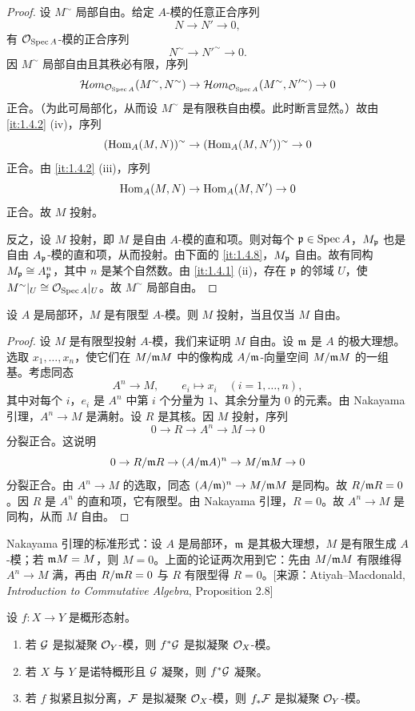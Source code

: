 \begin{proof}
设 $M^\sim$ 局部自由。给定 $A$-模的任意正合序列
\[
N\to N'\to0,
\]
有 $\mathcal{O}_{\operatorname{Spec} A}$-模的正合序列
\[
N^\sim\to N'^\sim\to0.
\]
因 $M^\sim$ 局部自由且其秩必有限，序列
\[
\mathcal{H}om_{\mathcal{O}_{\operatorname{Spec} A}}(M^\sim,N^\sim)\to\mathcal{H}om_{\mathcal{O}_{\operatorname{Spec} A}}(M^\sim,N'^\sim)\to0
\]
正合。（为此可局部化，从而设 $M^\sim$ 是有限秩自由模。此时断言显然。）故由 \ref{it:1.4.2} (iv)，序列
\[
(\operatorname{Hom}_A(M,N))^\sim\to(\operatorname{Hom}_A(M,N'))^\sim\to0
\]
正合。由 \ref{it:1.4.2} (iii)，序列
\[
\operatorname{Hom}_A(M,N)\to\operatorname{Hom}_A(M,N')\to0
\]
正合。故 $M$ 投射。

反之，设 $M$ 投射，即 $M$ 是自由 $A$-模的直和项。则对每个 $\mathfrak{p}\in\operatorname{Spec} A$，$M_{\mathfrak{p}}$ 也是自由 $A_{\mathfrak{p}}$-模的直和项，从而投射。由下面的 \ref{it:1.4.8}，$M_{\mathfrak{p}}$ 自由。故有同构 $M_{\mathfrak{p}}\cong A_{\mathfrak{p}}^n$，其中 $n$ 是某个自然数。由 \ref{it:1.4.1} (ii)，存在 $\mathfrak{p}$ 的邻域 $U$，使 $M^\sim|_U\cong\mathcal{O}_{\operatorname{Spec} A}|_U$。故 $M^\sim$ 局部自由。
\end{proof}

\begin{lemma}\label{it:1.4.8}
设 $A$ 是局部环，$M$ 是有限型 $A$-模。则 $M$ 投射，当且仅当 $M$ 自由。
\end{lemma}

\begin{proof}
设 $M$ 是有限型投射 $A$-模，我们来证明 $M$ 自由。设 $\mathfrak{m}$ 是 $A$ 的极大理想。选取 $x_1,\dots,x_n$，使它们在 $M/\mathfrak{m} M$ 中的像构成 $A/\mathfrak{m}$-向量空间 $M/\mathfrak{m} M$ 的一组基。考虑同态
\[
A^n\to M,\qquad e_i\mapsto x_i\quad(i=1,\dots,n),
\]
其中对每个 $i$，$e_i$ 是 $A^n$ 中第 $i$ 个分量为 $1$、其余分量为 $0$ 的元素。由 Nakayama 引理，$A^n\to M$ 是满射。设 $R$ 是其核。因 $M$ 投射，序列
\[
0\to R\to A^n\to M\to0
\]
分裂正合。这说明
\[
0\to R/\mathfrak{m} R\to(A/\mathfrak{m} A)^n\to M/\mathfrak{m} M\to0
\]
分裂正合。由 $A^n\to M$ 的选取，同态 $(A/\mathfrak{m})^n\to M/\mathfrak{m} M$ 是同构。故 $R/\mathfrak{m} R=0$。因 $R$ 是 $A^n$ 的直和项，它有限型。由 Nakayama 引理，$R=0$。故 $A^n\to M$ 是同构，从而 $M$ 自由。
\end{proof}
\begin{tnote}
Nakayama 引理的标准形式：设 $A$ 是局部环，$\mathfrak{m}$ 是其极大理想，$M$ 是有限生成 $A$-模；若 $\mathfrak{m} M=M$，则 $M=0$。上面的论证两次用到它：先由 $M/\mathfrak{m} M$ 有限维得 $A^n\to M$ 满，再由 $R/\mathfrak{m} R=0$ 与 $R$ 有限型得 $R=0$。[来源：Atiyah--Macdonald, \emph{Introduction to Commutative Algebra}, Proposition 2.8]
\end{tnote}

\begin{proposition}\label{it:1.4.9}
设 $f\colon X\to Y$ 是概形态射。
\begin{enumerate}[label=(\roman*),leftmargin=2.8em]
  \item 若 $\mathcal{G}$ 是拟凝聚 $\mathcal{O}_Y$-模，则 $f^*\mathcal{G}$ 是拟凝聚 $\mathcal{O}_X$-模。
  \item 若 $X$ 与 $Y$ 是诺特概形且 $\mathcal{G}$ 凝聚，则 $f^*\mathcal{G}$ 凝聚。
  \item 若 $f$ 拟紧且拟分离，$\mathcal{F}$ 是拟凝聚 $\mathcal{O}_X$-模，则 $f_*\mathcal{F}$ 是拟凝聚 $\mathcal{O}_Y$-模。
\end{enumerate}
\end{proposition}

